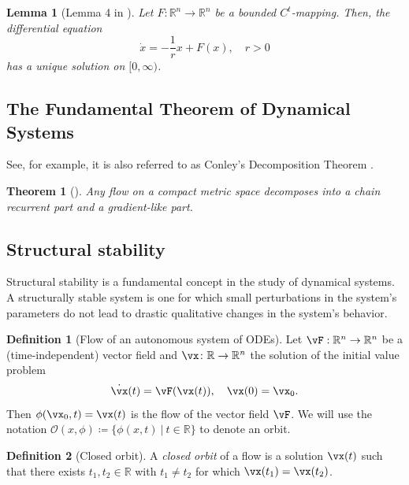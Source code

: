 \documentclass{article}
\newtheorem{theorem}{Theorem}
\newtheorem{lemma}{Lemma}
\theoremstyle{definition}
\newtheorem{definition}{Definition}
\theoremstyle{remark}
\newcommand{\reals}{\mathbb{R}}
\newcounter{ct}
\begin{document}
\begin{lemma}[Lemma 4 in \citep{funahashi1993approximation}]
Let \( F: \mathbb{R}^n \to \mathbb{R}^n \) be a bounded \( C^t \)-mapping. Then, the differential equation
\[
\dot{x} = -\frac{1}{r} x + F(x), \quad r > 0
\]
has a unique solution on \([0, \infty)\).
\end{lemma}	





\subsection{The Fundamental Theorem of Dynamical Systems}
See, for example\citep{conley1978morse, norton1995fundamental}, it is also referred to as Conley's Decomposition Theorem \citep{mischaikow1999cit}.

\begin{theorem}[\citep{conley1978morse}]
 Any flow on a compact metric space decomposes into a chain recurrent part and a gradient-like part.
\end{theorem}

\subsection{Structural stability}
\citep{peixoto1959ss, mane1987ss, hu1994ss, hayashi1997invariant, robbin1971ss, robinson1974ss, palis1970ss}

Structural stability is a fundamental concept in the study of dynamical systems. A structurally stable system is one for which small perturbations in the system's parameters do not lead to drastic qualitative changes in the system's behavior.

\begin{definition}[Flow of an autonomous system of ODEs]
Let $\vF: \reals^n\rightarrow \reals^n$ be a (time-independent) vector field and $\vx\colon\reals\rightarrow\reals^n$  the solution of the initial value problem
\[
\dot\vx(t) =  \vF(\vx(t)), \ \ \ \vx(0) = \vx_0.
\]
Then $ \phi (\vx_{0},t)=\vx(t)$ is the flow of the vector field $\vF$.
We will use the notation $\mathcal {O}(x,\phi)\coloneqq \{\phi(x,t)\ |\ t\in\reals\}$ to denote an orbit.
\end{definition}


\begin{definition}[Closed orbit]
A \emph{closed orbit} of a flow is a solution $\vx(t)$ such that there exists $t_1, t_2\in\reals$ with  $t_1\neq t_2$ for which $\vx(t_1) = \vx(t_2)$.
\end{definition}
\end{document}
